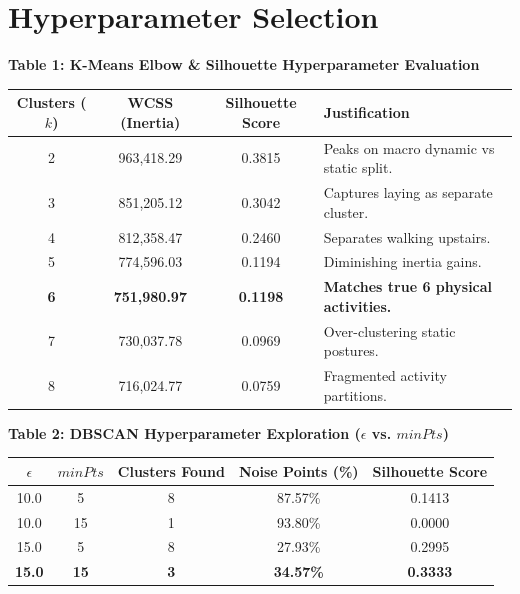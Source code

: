 \documentclass[12pt,a4paper]{article}
\begin{document}
\section{Hyperparameter Selection}

\textbf{Table 1: K-Means Elbow \& Silhouette Hyperparameter Evaluation}
\begin{table}[H]
\centering
\begin{tabular}{|c|c|c|p{6cm}|}
\hline
\textbf{Clusters ($k$)} & \textbf{WCSS (Inertia)} & \textbf{Silhouette Score} & \textbf{Justification} \\ \hline
2 & 963,418.29 & 0.3815 & Peaks on macro dynamic vs static split. \\ \hline
3 & 851,205.12 & 0.3042 & Captures laying as separate cluster. \\ \hline
4 & 812,358.47 & 0.2460 & Separates walking upstairs. \\ \hline
5 & 774,596.03 & 0.1194 & Diminishing inertia gains. \\ \hline
\textbf{6} & \textbf{751,980.97} & \textbf{0.1198} & \textbf{Matches true 6 physical activities.} \\ \hline
7 & 730,037.78 & 0.0969 & Over-clustering static postures. \\ \hline
8 & 716,024.77 & 0.0759 & Fragmented activity partitions. \\ \hline
\end{tabular}
\end{table}

\textbf{Table 2: DBSCAN Hyperparameter Exploration ($\epsilon$ vs. $minPts$)}
\begin{table}[H]
\centering
\begin{tabular}{|c|c|c|c|c|}
\hline
\textbf{$\epsilon$} & \textbf{$minPts$} & \textbf{Clusters Found} & \textbf{Noise Points (\%)} & \textbf{Silhouette Score} \\ \hline
10.0 & 5 & 8 & 87.57\% & 0.1413 \\ \hline
10.0 & 15 & 1 & 93.80\% & 0.0000 \\ \hline
15.0 & 5 & 8 & 27.93\% & 0.2995 \\ \hline
\textbf{15.0} & \textbf{15} & \textbf{3} & \textbf{34.57\%} & \textbf{0.3333} \\ \hline
\end{tabular}
\end{table}
\end{document}
